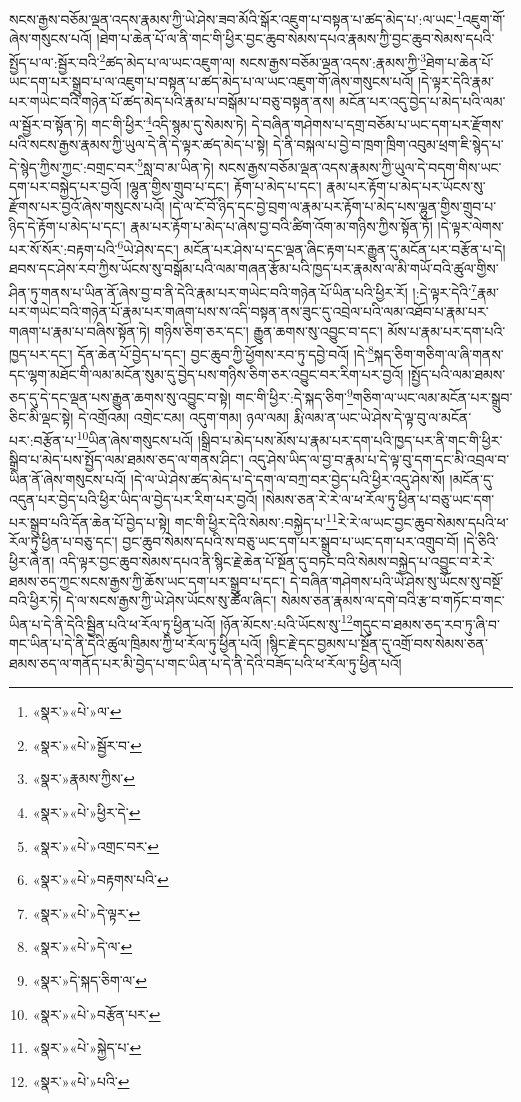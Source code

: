 སངས་རྒྱས་བཅོམ་ལྡན་འདས་རྣམས་ཀྱི་ཡེ་ཤེས་ཟབ་མོའི་སྒོར་འཇུག་པ་བསྟན་པ་ཚད་མེད་པ་:ལ་ཡང་\footnote{«སྣར་»«པེ་»ལ་}འཇུག་གོ་ཞེས་གསུངས་པའོ། །ཐེག་པ་ཆེན་པོ་ལ་ནི་གང་གི་ཕྱིར་བྱང་ཆུབ་སེམས་དཔའ་རྣམས་ཀྱི་བྱང་ཆུབ་སེམས་དཔའི་སྤྱོད་པ་ལ་:སྦྱོར་བའི་\footnote{«སྣར་»«པེ་»སྦྱོར་བ་}ཚད་མེད་པ་ལ་ཡང་འཇུག་ལ། སངས་རྒྱས་བཅོམ་ལྡན་འདས་:རྣམས་ཀྱི་\footnote{«སྣར་»རྣམས་ཀྱིས་}ཐེག་པ་ཆེན་པོ་ཡང་དག་པར་སྒྲུབ་པ་ལ་འཇུག་པ་བསྟན་པ་ཚད་མེད་པ་ལ་ཡང་འཇུག་གོ་ཞེས་གསུངས་པའོ། །དེ་ལྟར་དེའི་རྣམ་པར་གཡེང་བའི་གཉེན་པོ་ཚད་མེད་པའི་རྣམ་པ་བསྒོམ་པ་བཅུ་བསྟན་ནས། མངོན་པར་འདུ་བྱེད་པ་མེད་པའི་ལམ་ལ་སྦྱོར་བ་སྟོན་ཏེ། གང་གི་ཕྱིར་\footnote{«སྣར་»«པེ་»ཕྱིར་དེ་}འདི་སྙམ་དུ་སེམས་ཏེ། དེ་བཞིན་གཤེགས་པ་དགྲ་བཅོམ་པ་ཡང་དག་པར་རྫོགས་པའི་སངས་རྒྱས་རྣམས་ཀྱི་ཡུལ་དེ་ནི་དེ་ལྟར་ཚད་མེད་པ་སྟེ། དེ་ནི་བསྐལ་པ་བྱེ་བ་ཁྲག་ཁྲིག་འབུམ་ཕྲག་ཇི་སྙེད་པ་དེ་སྙེད་ཀྱིས་ཀྱང་:བགྲང་བར་\footnote{«སྣར་»«པེ་»འགྲང་བར་}སླ་བ་མ་ཡིན་ཏེ། སངས་རྒྱས་བཅོམ་ལྡན་འདས་རྣམས་ཀྱི་ཡུལ་དེ་བདག་གིས་ཡང་དག་པར་བསྐྱེད་པར་བྱའོ། །ལྷུན་གྱིས་གྲུབ་པ་དང་། རྟོག་པ་མེད་པ་དང་། རྣམ་པར་རྟོག་པ་མེད་པར་ཡོངས་སུ་རྫོགས་པར་བྱའོ་ཞེས་གསུངས་པའོ། །དེ་ལ་ངོ་བོ་ཉིད་དང་བྱེ་བྲག་ལ་རྣམ་པར་རྟོག་པ་མེད་པས་ལྷུན་གྱིས་གྲུབ་པ་ཉིད་དེ་རྟོག་པ་མེད་པ་དང་། རྣམ་པར་རྟོག་པ་མེད་པ་ཞེས་བྱ་བའི་ཚིག་འོག་མ་གཉིས་ཀྱིས་སྟོན་ཏོ། །དེ་ལྟར་ལེགས་པར་སོ་སོར་:བརྟག་པའི་\footnote{«སྣར་»«པེ་»བརྟགས་པའི་}ཡེ་ཤེས་དང་། མངོན་པར་ཤེས་པ་དང་ལྡན་ཞིང་རྟག་པར་རྒྱུན་དུ་མངོན་པར་བརྩོན་པ་དེ། ཐབས་དང་ཤེས་རབ་ཀྱིས་ཡོངས་སུ་བསྒོམ་པའི་ལམ་གཞན་རྩོམ་པའི་ཁྱད་པར་རྣམས་ལ་མི་གཡོ་བའི་ཚུལ་གྱིས་ཤིན་ཏུ་གནས་པ་ཡིན་ནོ་ཞེས་བྱ་བ་ནི་དེའི་རྣམ་པར་གཡེང་བའི་གཉེན་པོ་ཡིན་པའི་ཕྱིར་རོ། །:དེ་ལྟར་དེའི་\footnote{«སྣར་»«པེ་»དེ་ལྟར་}རྣམ་པར་གཡེང་བའི་གཉེན་པོ་རྣམ་པར་གཞག་པས་ས་འདི་བསྟན་ནས་ཟུང་དུ་འབྲེལ་པའི་ལམ་འཐོབ་པ་རྣམ་པར་གཞག་པ་རྣམ་པ་བཞིས་སྟོན་ཏེ། གཉིས་ཅིག་ཅར་དང་། རྒྱུན་ཆགས་སུ་འབྱུང་བ་དང་། མོས་པ་རྣམ་པར་དག་པའི་ཁྱད་པར་དང་། དོན་ཆེན་པོ་བྱེད་པ་དང་། བྱང་ཆུབ་ཀྱི་ཕྱོགས་རབ་ཏུ་དབྱེ་བའོ། །དེ་\footnote{«སྣར་»«པེ་»དེ་ལ་}སྐད་ཅིག་གཅིག་ལ་ཞི་གནས་དང་ལྷག་མཐོང་གི་ལམ་མངོན་སུམ་དུ་བྱེད་པས་གཉིས་ཅིག་ཅར་འབྱུང་བར་རིག་པར་བྱའོ། །སྤྱོད་པའི་ལམ་ཐམས་ཅད་དུ་དེ་དང་ལྡན་པས་རྒྱུན་ཆགས་སུ་འབྱུང་བ་སྟེ། གང་གི་ཕྱིར་:དེ་སྐད་ཅིག་\footnote{«སྣར་»དེ་སྐད་ཅིག་ལ་}གཅིག་ལ་ཡང་ལམ་མངོན་པར་སྒྲུབ་ཅིང་མི་ལྡང་སྟེ། དེ་འགྲོའམ། འགྲེང་ངམ། འདུག་གམ། ཉལ་ལམ། རྨི་ལམ་ན་ཡང་ཡེ་ཤེས་དེ་ལྟ་བུ་ལ་མངོན་པར་:བརྩོན་པ་\footnote{«སྣར་»«པེ་»བརྩོན་པར་}ཡིན་ཞེས་གསུངས་པའོ། །སྒྲིབ་པ་མེད་པས་མོས་པ་རྣམ་པར་དག་པའི་ཁྱད་པར་ནི་གང་གི་ཕྱིར་སྒྲིབ་པ་མེད་པས་སྤྱོད་ལམ་ཐམས་ཅད་ལ་གནས་ཤིང་། འདུ་ཤེས་ཡིད་ལ་བྱ་བ་རྣམ་པ་དེ་ལྟ་བུ་དག་དང་མི་འབྲལ་བ་ཡིན་ནོ་ཞེས་གསུངས་པའོ། །དེ་ལ་ཡེ་ཤེས་ཚད་མེད་པ་དེ་དག་ལ་བཀྲ་བར་བྱེད་པའི་ཕྱིར་འདུ་ཤེས་སོ། །མངོན་དུ་འདུན་པར་བྱེད་པའི་ཕྱིར་ཡིད་ལ་བྱེད་པར་རིག་པར་བྱའོ། །སེམས་ཅན་རེ་རེ་ལ་ཕ་རོལ་ཏུ་ཕྱིན་པ་བཅུ་ཡང་དག་པར་སྒྲུབ་པའི་དོན་ཆེན་པོ་བྱེད་པ་སྟེ། གང་གི་ཕྱིར་དེའི་སེམས་:བསྐྱེད་པ་\footnote{«སྣར་»«པེ་»སྐྱེད་པ་}རེ་རེ་ལ་ཡང་བྱང་ཆུབ་སེམས་དཔའི་ཕ་རོལ་ཏུ་ཕྱིན་པ་བཅུ་དང་། བྱང་ཆུབ་སེམས་དཔའི་ས་བཅུ་ཡང་དག་པར་སྒྲུབ་པ་ཡང་དག་པར་འགྲུབ་བོ། །དེ་ཅིའི་ཕྱིར་ཞེ་ན། འདི་ལྟར་བྱང་ཆུབ་སེམས་དཔའ་ནི་སྙིང་རྗེ་ཆེན་པོ་སྔོན་དུ་བཏང་བའི་སེམས་བསྐྱེད་པ་འབྱུང་བ་རེ་རེ་ཐམས་ཅད་ཀྱང་སངས་རྒྱས་ཀྱི་ཆོས་ཡང་དག་པར་སྒྲུབ་པ་དང་། དེ་བཞིན་གཤེགས་པའི་ཡེ་ཤེས་སུ་ཡོངས་སུ་བསྔོ་བའི་ཕྱིར་ཏེ། དེ་ལ་སངས་རྒྱས་ཀྱི་ཡེ་ཤེས་ཡོངས་སུ་ཚོལ་ཞིང་། སེམས་ཅན་རྣམས་ལ་དགེ་བའི་རྩ་བ་གཏོང་བ་གང་ཡིན་པ་དེ་ནི་དེའི་སྦྱིན་པའི་ཕ་རོལ་ཏུ་ཕྱིན་པའོ། །ཉོན་མོངས་:པའི་ཡོངས་སུ་\footnote{«སྣར་»«པེ་»པའི་}གདུང་བ་ཐམས་ཅད་རབ་ཏུ་ཞི་བ་གང་ཡིན་པ་དེ་ནི་དེའི་ཚུལ་ཁྲིམས་ཀྱི་ཕ་རོལ་ཏུ་ཕྱིན་པའོ། །སྙིང་རྗེ་དང་བྱམས་པ་སྔོན་དུ་འགྲོ་བས་སེམས་ཅན་ཐམས་ཅད་ལ་གནོད་པར་མི་བྱེད་པ་གང་ཡིན་པ་དེ་ནི་དེའི་བཟོད་པའི་ཕ་རོལ་ཏུ་ཕྱིན་པའོ། 
